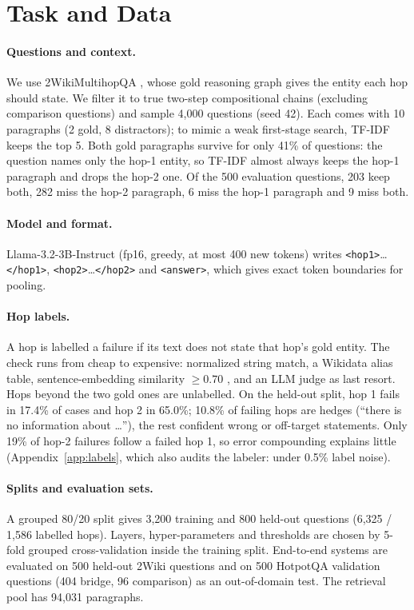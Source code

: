 \documentclass[11pt]{article}
\begin{document}
\section{Task and Data}

\paragraph{Questions and context.} We use 2WikiMultihopQA \citep{ho2020constructing}, whose gold reasoning graph gives the entity each hop should state. We filter it to true two-step compositional chains (excluding comparison questions) and sample 4,000 questions (seed 42). Each comes with 10 paragraphs (2 gold, 8 distractors); to mimic a weak first-stage search, TF-IDF keeps the top 5. Both gold paragraphs survive for only 41\% of questions: the question names only the hop-1 entity, so TF-IDF almost always keeps the hop-1 paragraph and drops the hop-2 one. Of the 500 evaluation questions, 203 keep both, 282 miss the hop-2 paragraph, 6 miss the hop-1 paragraph and 9 miss both.

\paragraph{Model and format.} Llama-3.2-3B-Instruct \citep{dubey2024llama} (fp16, greedy, at most 400 new tokens) writes \texttt{<hop1>}\ldots\texttt{</hop1>}, \texttt{<hop2>}\ldots\texttt{</hop2>} and \texttt{<answer>}, which gives exact token boundaries for pooling.

\paragraph{Hop labels.} A hop is labelled a failure if its text does not state that hop's gold entity. The check runs from cheap to expensive: normalized string match, a Wikidata alias table, sentence-embedding similarity $\geq 0.70$ \citep{reimers2019sentence}, and an LLM judge as last resort. Hops beyond the two gold ones are unlabelled. On the held-out split, hop 1 fails in 17.4\% of cases and hop 2 in 65.0\%; 10.8\% of failing hops are hedges (``there is no information about \ldots''), the rest confident wrong or off-target statements. Only 19\% of hop-2 failures follow a failed hop 1, so error compounding explains little (Appendix~\ref{app:labels}, which also audits the labeler: under 0.5\% label noise).

\paragraph{Splits and evaluation sets.} A grouped 80/20 split gives 3,200 training and 800 held-out questions (6,325 / 1,586 labelled hops). Layers, hyper-parameters and thresholds are chosen by 5-fold grouped cross-validation inside the training split. End-to-end systems are evaluated on 500 held-out 2Wiki questions and on 500 HotpotQA \citep{yang2018hotpotqa} validation questions (404 bridge, 96 comparison) as an out-of-domain test. The retrieval pool has 94,031 paragraphs.
\end{document}
